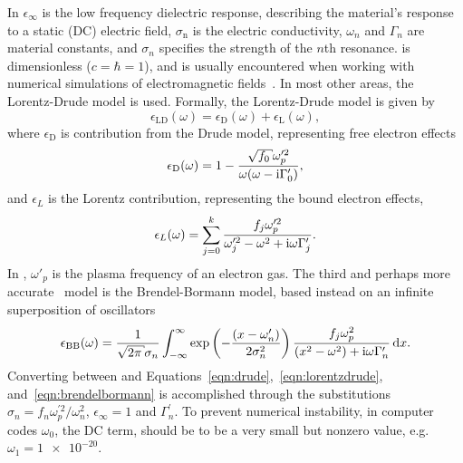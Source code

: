 In  $\epsilon_\infty$ is the low frequency
dielectric response, describing the material's response to a static (DC)
electric field, $\sigma_\mathrm{n}$ is the electric conductivity,
$\omega_n$ and $\Gamma_n$ are material constants, and $\sigma_n$ specifies
the strength of the $n$th resonance.   is
dimensionless ($c=\hbar=1$), and is usually encountered when working with
numerical simulations of electromagnetic fields~\cite{oskooi2010meep}.  In
most other areas, the Lorentz-Drude model is used.  Formally, the
Lorentz-Drude model is given by
\begin{equation}
\epsilon_\mathrm{LD}(\omega)=\epsilon_\mathrm{D}(\omega)+\epsilon_\mathrm{L}(\omega),
\end{equation}
where $\epsilon_\mathrm{D}$ is contribution from the Drude model, representing
free electron effects
\begin{align}
\epsilon_\mathrm{D}(\omega)=1-\frac{\sqrt{f_0} \omega_p^{\prime 2}}{\omega(\omega -
\mi\Gamma_0^\prime)},
\label{eqn:drude}
\end{align}
and $\epsilon_L$ is the Lorentz contribution, representing the bound
electron effects,
\begin{align}
\epsilon_L(\omega) =\sum_{j=0}^{k}\frac{f_j\omega_p^{\prime 2}}{\omega_j^{\prime
2}-\omega^2+{\mathrm{i}}\omega\Gamma_j^\prime}.
\label{eqn:lorentzdrude}
\end{align}
In , $\omega'_p$ is the plasma frequency of an
electron gas.  The third and perhaps more
accurate~\cite{jahanshahi2014study} model is the
Brendel-Bormann model, based instead on an infinite superposition
of oscillators
\begin{align}
\epsilon_\text{BB}(\omega) = \frac{1}{\sqrt{2 \pi} \sigma_n} \intinfty
\exp\left(-\frac{(x-\omega'_n)}{2 \sigma_n^2}\right)
\frac{f_j \omega_p^2}{(x^2-\omega^2)+\mi \omega \Gamma'_n} \md x.
\label{eqn:brendelbormann}
\end{align}
Converting between  and
Equations~\ref{eqn:drude},~\ref{eqn:lorentzdrude}, and~\ref{eqn:brendelbormann} is accomplished through the substitutions $\sigma_n
= {f_n \omega_p^{\prime 2}}/{\omega_n^2}$, $\epsilon_\infty=1$ and
$\Gamma_n^\prime$.  To prevent numerical instability, in computer codes
$\omega_0$, the DC term, should be to be a very small but nonzero value,
e.g.  $\omega_1 = \num{1e-20}$. 

